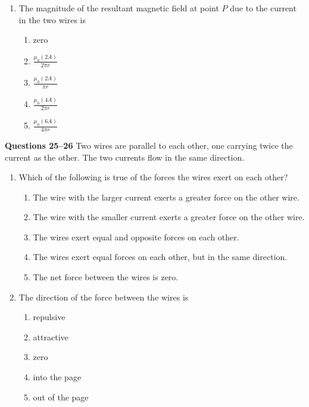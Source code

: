 \documentclass{../../oss-apphys}
\begin{document}
\begin{multicols}{2}
\begin{enumerate}[leftmargin=18pt,resume]
  \item The magnitude of the resultant magnetic field at point $P$ due to the
    current in the two wires is
    \begin{enumerate}[noitemsep,topsep=0pt,leftmargin=18pt,label=(\Alph*)]
    \item zero
    \item $\displaystyle\frac{\mu_0(2A)}{2\pi r}$
    \item $\displaystyle\frac{\mu_0(2A)}{\pi r}$
    \item $\displaystyle\frac{\mu_0(4A)}{2\pi r}$
    \item $\displaystyle\frac{\mu_0(6A)}{4\pi r}$
    \end{enumerate}
  \end{enumerate}
  \columnbreak
  \textbf{Questions 25--26}
  Two wires are parallel to each other, one carrying twice the current as the
  other. The two currents flow in the same direction.

  \begin{enumerate}[leftmargin=18pt,resume]
  \item Which of the following is true of the forces the wires exert on each
    other?
    \begin{enumerate}[noitemsep,topsep=0pt,leftmargin=18pt,label=(\Alph*)]
    \item The wire with the larger current exerts a greater force on the other
      wire.
    \item The wire with the smaller current exerts a greater force on the other
      wire.
    \item The wires exert equal and opposite forces on each other.
    \item The wires exert equal forces on each other, but in the same direction.
    \item The net force between the wires is zero.
    \end{enumerate}

  \item The direction of the force between the wires is
    \begin{enumerate}[noitemsep,topsep=0pt,leftmargin=18pt,label=(\Alph*)]
    \item repulsive
    \item attractive
    \item zero
    \item into the page
    \item out of the page
    \end{enumerate}


\end{enumerate}
\end{multicols}
\end{document}
